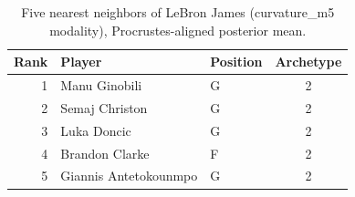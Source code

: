 \begin{table}[htbp]
  \centering\small
  \begin{tabular}{rllc}
    \toprule
    Rank & Player & Position & Archetype \\
    \midrule
    1 & Manu Ginobili & G & 2 \\
    2 & Semaj Christon & G & 2 \\
    3 & Luka Doncic & G & 2 \\
    4 & Brandon Clarke & F & 2 \\
    5 & Giannis Antetokounmpo & G & 2 \\
    \bottomrule
  \end{tabular}
  \caption{Five nearest neighbors of LeBron James (curvature_m5 modality), Procrustes-aligned posterior mean.}
  \label{tab:LeBron_James_neighbors_curvature_m5}
\end{table}

